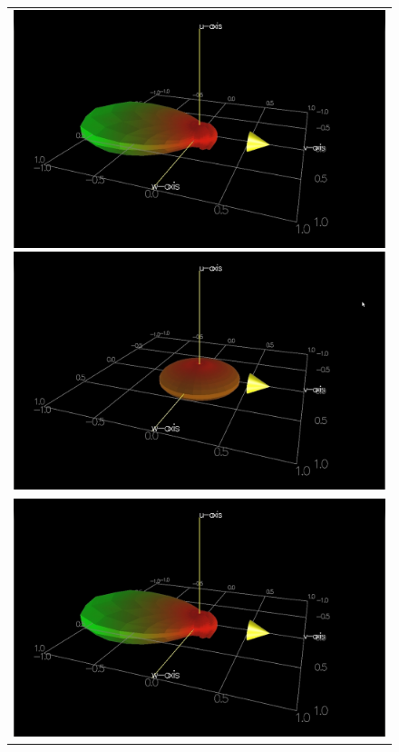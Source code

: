 \documentclass[11pt,a4paper]{report}
\begin{document}
\begin{figure}
\begin{tabular}{c}
\includegraphics[scale=0.2]{images/strands0_colorR.jpg}
\includegraphics[scale=0.2]{images/strands1_colorR.jpg} \\
\includegraphics[scale=0.2]{images/strands0_colorR.jpg}

\end{tabular}
\end{figure}
\end{document}
